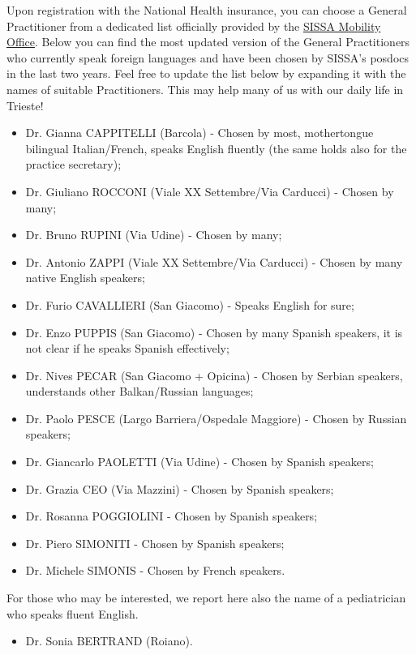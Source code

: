 \documentclass{sissavademecum}
\begin{document}
Upon registration with the National Health insurance, you can choose a General Practitioner from a dedicated list officially provided by the \href{mobility@sissa.it}{SISSA Mobility Office}. Below you can find the most updated version of the General Practitioners who currently speak foreign languages and have been chosen by SISSA's posdocs in the last two years. Feel free to update the list below by expanding it with the names of suitable Practitioners. This may help many of us with our daily life in Trieste!
\begin{itemize}
    \item Dr. Gianna CAPPITELLI (Barcola) - Chosen by most, mothertongue bilingual Italian/French, speaks English fluently (the same holds also for the practice secretary);
    \item Dr. Giuliano ROCCONI (Viale XX Settembre/Via Carducci) - Chosen by many;
    \item Dr. Bruno RUPINI (Via Udine) - Chosen by many;
    \item Dr. Antonio ZAPPI (Viale XX Settembre/Via Carducci) - Chosen by many native English speakers;
    \item Dr. Furio CAVALLIERI (San Giacomo) - Speaks English for sure;
    \item Dr. Enzo PUPPIS (San Giacomo) - Chosen by many Spanish speakers, it is not clear if he speaks Spanish effectively;
    \item Dr. Nives PECAR (San Giacomo + Opicina) - Chosen by Serbian speakers, understands other Balkan/Russian languages;
    \item Dr. Paolo PESCE (Largo Barriera/Ospedale Maggiore) - Chosen by Russian speakers;
    \item Dr. Giancarlo PAOLETTI (Via Udine) - Chosen by Spanish speakers;
    \item Dr. Grazia CEO (Via Mazzini) - Chosen by Spanish speakers;
    \item Dr. Rosanna POGGIOLINI - Chosen by Spanish speakers;
    \item Dr. Piero SIMONITI - Chosen by Spanish speakers;
    \item Dr. Michele SIMONIS - Chosen by French speakers.
\end{itemize}
For those who may be interested, we report here also the name of a pediatrician who speaks fluent English.
\begin{itemize}
    \item Dr. Sonia BERTRAND (Roiano).
\end{itemize}
\end{document}
